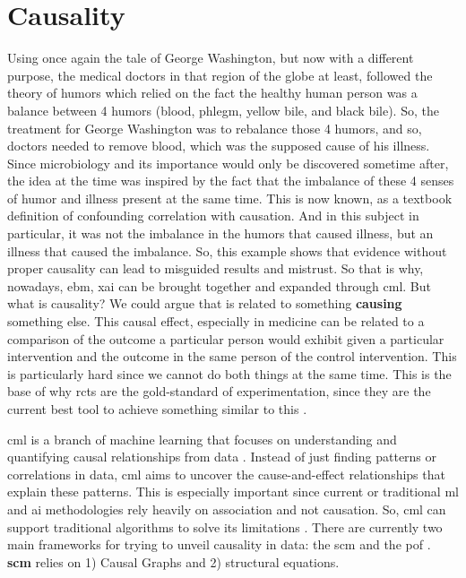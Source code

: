 \section{Causality}\label{causalml}
Using once again the tale of George Washington, but now with a different purpose, the medical doctors in that region of the globe at least, followed the theory of humors which relied on the fact the healthy human person was a balance between 4 humors (blood, phlegm, yellow bile, and black bile). So, the treatment for George Washington was to rebalance those 4 humors, and so, doctors needed to remove blood, which was the supposed cause of his illness. Since microbiology and its importance would only be discovered sometime after, the idea at the time was inspired by the fact that the imbalance of these 4 senses of humor and illness present at the same time.
This is now known, as a textbook definition of confounding correlation with causation. And in this subject in particular, it was not the imbalance in the humors that caused illness, but an illness that caused the imbalance.
So, this example shows that evidence without proper causality can lead to misguided results and mistrust.
So that is why, nowadays, \ac{ebm}, \ac{xai} can be brought together and expanded through \ac{cml}.
But what is causality? We could argue that is related to something \textbf{causing} something else. This causal effect, especially in medicine can be related to a comparison of the outcome a particular person would exhibit given a particular intervention and the outcome in the same person of the control intervention. This is particularly hard since we cannot do both things at the same time.  This is the base of why \acp{rct} are the gold-standard of experimentation, since they are the current best tool to achieve something similar to this \cite{10.7551/mitpress/14244.001.0001}.

\ac{cml} is a branch of machine learning that focuses on understanding and quantifying causal relationships from data \cite{hernanDefinitionCausalEffect2004}. Instead of just finding patterns or correlations in data, \ac{cml} aims to uncover the cause-and-effect relationships that explain these patterns.
This is especially important since current or traditional \ac{ml} and \ac{ai} methodologies rely heavily on association and not causation. So, \ac{cml} can support traditional algorithms to solve its limitations \cite{pearlTheoreticalImpedimentsMachine2018}.
There are currently two main frameworks for trying to unveil causality in data: the \ac{scm}  and the \ac{pof} \cite{shiLearningCausalEffects2022b}. \textbf{\ac{scm}} relies on 1) Causal Graphs and 2) structural equations.

